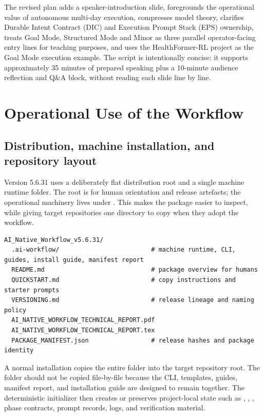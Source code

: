 \documentclass[11pt,a4paper]{article}
\newcommand{\code}[1]{\texttt{\detokenize{#1}}}
\begin{document}
The revised plan adds a speaker-introduction slide, foregrounds the operational value of autonomous multi-day execution, compresses model theory, clarifies Durable Intent Contract (DIC) and Execution Prompt Stack (EPS) ownership, treats Goal Mode, Structured Mode and Minor as three parallel operator-facing entry lines for teaching purposes, and uses the HealthFormer-RL project as the Goal Mode execution example. The script is intentionally concise: it supports approximately 35 minutes of prepared speaking plus a 10-minute audience reflection and Q\&A block, without reading each slide line by line.


\section{Operational Use of the Workflow}\label{sec:operational-use}


\subsection{Distribution, machine installation, and repository layout}\label{sec:repository-profiles}

Version 5.6.31 uses a deliberately flat distribution root and a single machine runtime folder. The root is for human orientation and release artefacts; the operational machinery lives under . This makes the package easier to inspect, while giving target repositories one directory to copy when they adopt the workflow.

\begin{lstlisting}[style=workflow]
AI_Native_Workflow_v5.6.31/
  .ai-workflow/                         # machine runtime, CLI, guides, install guide, manifest report
  README.md                             # package overview for humans
  QUICKSTART.md                         # copy instructions and starter prompts
  VERSIONING.md                         # release lineage and naming policy
  AI_NATIVE_WORKFLOW_TECHNICAL_REPORT.pdf
  AI_NATIVE_WORKFLOW_TECHNICAL_REPORT.tex
  PACKAGE_MANIFEST.json                 # release hashes and package identity
\end{lstlisting}

A normal installation copies the entire  folder into the target repository root. The folder should not be copied file-by-file because the CLI, templates, guides, manifest report, and installation guide are designed to remain together. The deterministic initializer then creates or preserves project-local state such as \code{AGENTS.md}, \code{agent.manifest.yaml}, \code{phases/}, phase contracts, prompt records, logs, and verification material.
\end{document}
